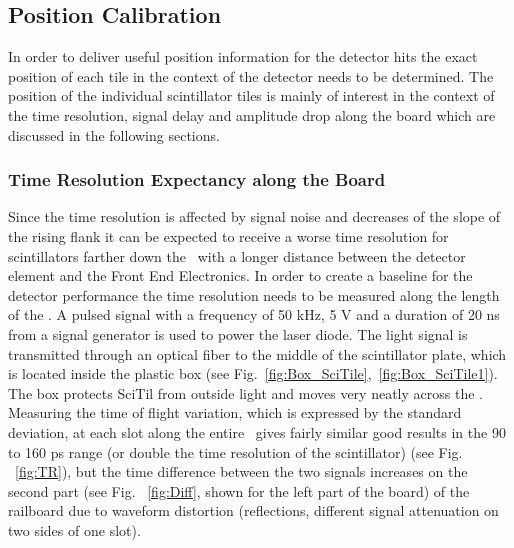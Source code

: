 \documentclass[../BTOF_summary.tex]{subfiles}
\begin{document}
\subsection{Position Calibration}

In order to deliver useful position information for the detector hits the exact position of each tile in the context of the detector needs to be determined.
The position of the individual scintillator tiles is mainly of interest in the context of the time resolution, signal delay and amplitude drop along the board which are discussed in the following sections.

\subsubsection{Time Resolution Expectancy along the Board}

Since the time resolution is affected by signal noise and decreases of the slope of the rising flank it can be expected to receive a worse time resolution for scintillators farther down the \railboard\ with a longer distance between the detector element and the Front End Electronics.
In order to create a baseline for the detector performance the time resolution needs to be measured along the length of the \railboard .
A pulsed signal with a frequency of 50 kHz, 5 V and a duration of 20 ns from a signal generator is used to power the laser diode. The light signal is transmitted through an optical fiber to the middle of the scintillator plate, which is located inside the plastic box (see Fig.~\ref{fig:Box_SciTile},~\ref{fig:Box_SciTile1}). The box protects SciTil from outside light and moves very neatly across the \railboard.
Measuring the time of flight variation, which is expressed by the standard deviation, at each slot along the entire \railboard\ gives fairly similar good results in the 90 to 160 ps range (or double the time resolution of the scintillator) (see Fig. ~\ref{fig:TR}), but the time difference between the two signals increases on the second part (see Fig. ~\ref{fig:Diff}, shown for the left part of the board) of the railboard due to waveform distortion (reflections, different signal attenuation on two sides of one slot).
\end{document}
